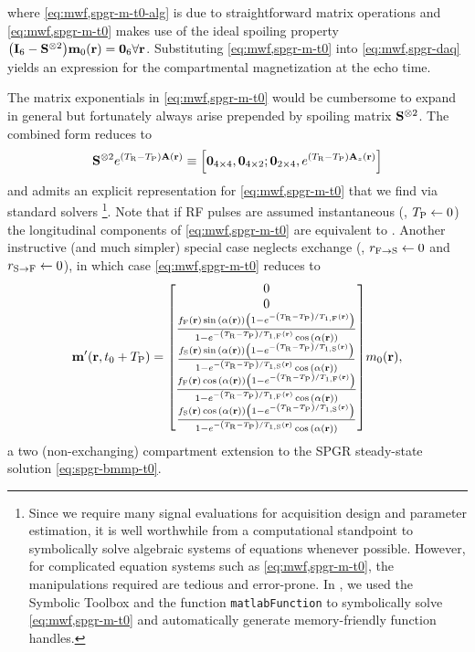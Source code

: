 where \eqref{eq:mwf,spgr-m-t0-alg} is due
to straightforward matrix operations
and \eqref{eq:mwf,spgr-m-t0} makes use 
of the ideal spoiling property
$\paren{\eye{6}-\bmSsix}\bmmzero\pr = \zeros{6}\xspace \forall\bmr$.
Substituting \eqref{eq:mwf,spgr-m-t0}
into \eqref{eq:mwf,spgr-daq}
yields an expression
for the compartmental magnetization 
at the echo time.

The matrix exponentials 
in \eqref{eq:mwf,spgr-m-t0} 
would be cumbersome to expand in general
but fortunately always arise
prepended by spoiling matrix $\mathbf{S}^{\otimes2}$.
The combined form reduces to
\begin{align}
	\bmSsix e^{\paren{\TR-\TP}\bmA\pr} \equiv
		\brac{\zeros{4 \times 4}, \zeros{4 \times 2}; 
		\zeros{2 \times 4}, e^{\paren{\TR-\TP} \bmAz\pr}}
	\label{eq:mwf,spgr-spoil-simp}
\end{align}
and admits 
an explicit representation 
for \eqref{eq:mwf,spgr-m-t0}
that we find
via standard solvers
\footnote{%
	Since we require many signal evaluations
	for acquisition design
	and parameter estimation,
	it is well worthwhile 
	from a computational standpoint
	to symbolically solve
	algebraic systems of equations
	whenever possible.
	However, 
	for complicated equation systems 
	such as \eqref{eq:mwf,spgr-m-t0}, 
	the manipulations required 
	are tedious and error-prone.
	In \matlab,
	we used the Symbolic Toolbox 
	and the function \texttt{matlabFunction}
	to symbolically solve \eqref{eq:mwf,spgr-m-t0}
	and automatically generate 
	memory-friendly function handles. 
}. 
Note that
if RF pulses are assumed instantaneous
(\ie, $T_\mathrm{P} \gets 0$)
the longitudinal components
of \eqref{eq:mwf,spgr-m-t0}
are equivalent to \cite[Eq.~34]{spencer:00:mos}.
Another instructive (and much simpler) special case
neglects exchange
(\ie, $r_{\mathrm{F}\to\mathrm{S}} \gets 0$ and $r_{\mathrm{S}\to\mathrm{F}} \gets 0$),
in which case \eqref{eq:mwf,spgr-m-t0} reduces to
\begin{align}
	\bmmp\paren{\bmr,t_0+\TP} =
	\begin{bmatrix}
		0 \\
		0 \\
		\frac{\ff\pr \sina{\flip\pr}\paren{1-e^{-\paren{\TR-\TP}/\tf{1}\pr}}}
			{1-e^{-\paren{\TR-\TP}/\tf{1}\pr}\cosa{\flip\pr}} \\
		\frac{\fs\pr \sina{\flip\pr}\paren{1-e^{-\paren{\TR-\TP}/\ts{1}\pr}}}
			{1-e^{-\paren{\TR-\TP}/\ts{1}\pr}\cosa{\flip\pr}} \\
		\frac{\ff\pr \cosa{\flip\pr}\paren{1-e^{-\paren{\TR-\TP}/\tf{1}\pr}}}
			{1-e^{-\paren{\TR-\TP}/\tf{1}\pr}\cosa{\flip\pr}} \\
		\frac{\fs\pr \cosa{\flip\pr}\paren{1-e^{-\paren{\TR-\TP}/\ts{1}\pr}}}
			{1-e^{-\paren{\TR-\TP}/\ts{1}\pr}\cosa{\flip\pr}}
	\end{bmatrix}
	\mzero\pr,
	\label{eq:mwf-spgr-m-t0-exchg0}
\end{align}
a two (non-exchanging) compartment extension
to the SPGR steady-state solution \eqref{eq:spgr-bmmp-t0}.

